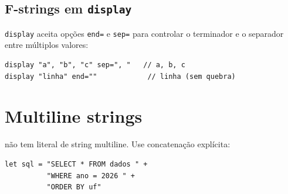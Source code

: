 \subsection*{F-strings em \texttt{display}}

\lstinline{display} aceita opções \lstinline{end=} e \lstinline{sep=} para controlar
o terminador e o separador entre múltiplos valores:

\begin{lstlisting}
display "a", "b", "c" sep=", "   // a, b, c
display "linha" end=""            // linha (sem quebra)
\end{lstlisting}

\section{Multiline strings}

\hayashi{} não tem literal de string multiline. Use concatenação explícita:

\begin{lstlisting}
let sql = "SELECT * FROM dados " +
          "WHERE ano = 2026 " +
          "ORDER BY uf"
\end{lstlisting}

